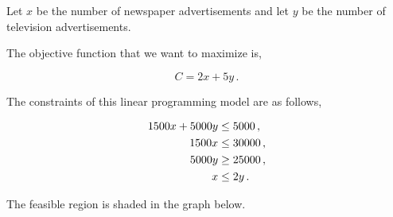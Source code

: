 %
%
\usetikzlibrary{patterns}

\begin{subquestions}
	

\subquestion

Let $x$ be the number of newspaper advertisements and let $y$ be the number of television advertisements.	

The objective function that we want to maximize is,

\begin{equation}
	C =2x+5y \,.
\end{equation} 

The constraints of this linear programming model are as follows,

\begin{align}
	1500x + 5000y & \leq 5000 \,, \nonumber \\
	1500x & \leq 30000 \,, \nonumber \\
	5000y & \geq 25000 \,, \nonumber \\
	x & \leq 2y \,.
\end{align}


\subquestion

\begin{subsubquestions}

	
\subsubquestion

The feasible region is shaded in the graph below.


\end{subsubquestions}
\end{subquestions}
